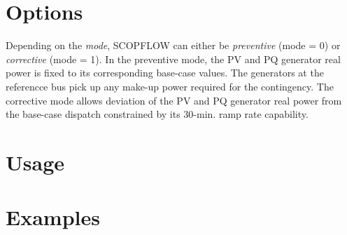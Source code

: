 \todo
\section{Options}
\todo

Depending on the \emph{mode}, SCOPFLOW can either be \emph{preventive} (mode = 0) or \emph{corrective} (mode = 1). In the preventive mode, the PV and PQ generator real power is fixed to its corresponding base-case values. The generators at the referencce bus pick up any make-up power required for the contingency. The corrective mode allows deviation of the PV and PQ generator real power from the base-case dispatch constrained by its 30-min. ramp rate capability.

\section{Usage}
\todo
\section{Examples}
\todo